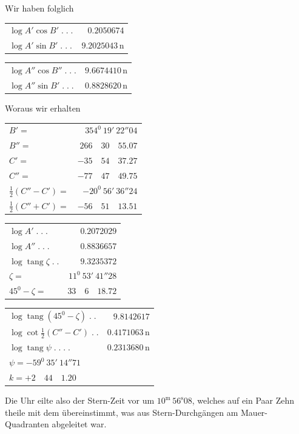 Wir haben folglich
\begin{center}\small
\begin{minipage}[t]{.49\textwidth}\centering
\begin{tabular}[t]{@{}lr@{}}
$\log A'\cos B'\;.\;.\;.$&$0.2050674$\\
$\log A'\sin B'\;.\;.\;.$&$9.2025043\,\mathrm n$
\end{tabular}
\end{minipage}\hfill
\begin{minipage}[t]{.49\textwidth}\centering
\begin{tabular}[t]{@{}lr@{}}
$\log A''\cos B''\;.\;.\;.$&$9.6674410\,\mathrm n$\\
$\log A''\sin B'\;.\;.\;.$&$0.8828620\,\mathrm n$
\end{tabular}
\end{minipage}
\end{center}
Woraus wir erhalten
\begin{center}\small
\begin{minipage}[t]{.49\textwidth}\centering
\begin{tabular}[t]{@{}lr@{}}
$B'=$&$354^0\ 19'\ 22''04$\\
$B''=$&$266\quad30\quad55.07$\\[6pt]
$C'=$&$-35\quad54\quad37.27$\\
$C''=$&$-77\quad47\quad49.75$\\[6pt]
$\tfrac12(C''-C')=$&$-20^0\ 56'\ 36''24$\\
$\tfrac12(C''+C')=$&$-56\quad51\quad13.51$
\end{tabular}
\end{minipage}\hfill
\begin{minipage}[t]{.49\textwidth}\centering
\begin{tabular}[t]{@{}lr@{}}
$\log A'\;.\;.\;.$&$0.2072029$\\
$\log A''\;.\;.\;.$&$0.8836657$\\[6pt]
$\log\operatorname{tang}\zeta\;.\;.$&$9.3235372$\\
$\zeta=$&$11^0\ 53'\ 41''28$\\[6pt]
$45^0-\zeta=$&$33\quad6\quad18.72$
\end{tabular}
\end{minipage}
\par\medskip
\begin{tabular}{lr}
$\log\operatorname{tang}(45^0-\zeta)\;.\;.$&$9.8142617$\\
$\log\cot\tfrac12(C''-C')\;.\;.$&$0.4171063\,\mathrm n$\\\hline
$\log\operatorname{tang}\psi\;.\;.\;.\;.$&$0.2313680\,\mathrm n$\\
\multicolumn{2}{l}{$\psi=-59^0\ 35'\ 14''71$}\\
\multicolumn{2}{l}{$k=+2\quad44\quad1.20$}
\end{tabular}
\end{center}
Die Uhr eilte also der Stern-Zeit vor um $10^{\mathrm m}\,56^{\mathrm s}08$, welches auf ein Paar Zehn%
%
theile mit dem übereinstimmt, was aus Stern-Durchgängen am Mauer-Quadranten
abgeleitet war.


